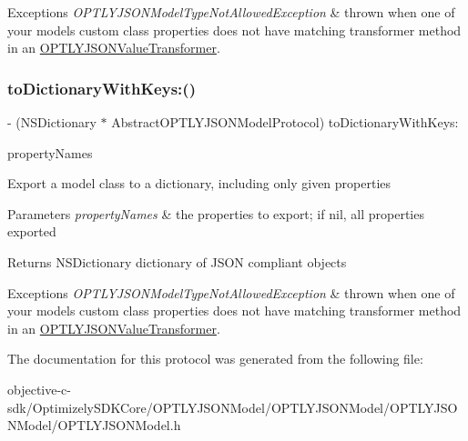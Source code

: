 \begin{DoxyExceptions}{Exceptions}
{\em O\+P\+T\+L\+Y\+J\+S\+O\+N\+Model\+Type\+Not\+Allowed\+Exception} & thrown when one of your model\textquotesingle{}s custom class properties does not have matching transformer method in an \mbox{\hyperlink{interface_o_p_t_l_y_j_s_o_n_value_transformer}{O\+P\+T\+L\+Y\+J\+S\+O\+N\+Value\+Transformer}}. \\
\hline
\end{DoxyExceptions}
\mbox{\label{protocol_abstract_o_p_t_l_y_j_s_o_n_model_protocol_01-p_ae7ec29d3e3b0044f07da386cf0a10d8d}} 
\subsubsection{\texorpdfstring{to\+Dictionary\+With\+Keys\+:()}{toDictionaryWithKeys:()}}
{\footnotesize\ttfamily -\/ (N\+S\+Dictionary $\ast$ Abstract\+O\+P\+T\+L\+Y\+J\+S\+O\+N\+Model\+Protocol) to\+Dictionary\+With\+Keys\+: \begin{DoxyParamCaption}\item[{(N\+S\+Array $\ast$)}]{property\+Names }\end{DoxyParamCaption}\hspace{0.3cm}{\ttfamily [required]}}

Export a model class to a dictionary, including only given properties


\begin{DoxyParams}{Parameters}
{\em property\+Names} & the properties to export; if nil, all properties exported \\
\hline
\end{DoxyParams}
\begin{DoxyReturn}{Returns}
N\+S\+Dictionary dictionary of J\+S\+ON compliant objects 
\end{DoxyReturn}

\begin{DoxyExceptions}{Exceptions}
{\em O\+P\+T\+L\+Y\+J\+S\+O\+N\+Model\+Type\+Not\+Allowed\+Exception} & thrown when one of your model\textquotesingle{}s custom class properties does not have matching transformer method in an \mbox{\hyperlink{interface_o_p_t_l_y_j_s_o_n_value_transformer}{O\+P\+T\+L\+Y\+J\+S\+O\+N\+Value\+Transformer}}. \\
\hline
\end{DoxyExceptions}


The documentation for this protocol was generated from the following file\+:\begin{DoxyCompactItemize}
\item 
objective-\/c-\/sdk/\+Optimizely\+S\+D\+K\+Core/\+O\+P\+T\+L\+Y\+J\+S\+O\+N\+Model/\+O\+P\+T\+L\+Y\+J\+S\+O\+N\+Model/\+O\+P\+T\+L\+Y\+J\+S\+O\+N\+Model/O\+P\+T\+L\+Y\+J\+S\+O\+N\+Model.\+h\end{DoxyCompactItemize}
